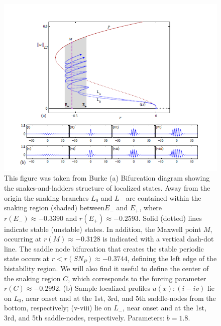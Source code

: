 \documentclass[pre,preprint,superscriptaddress]{revtex4-1}
\begin{document}
\begin{figure}[!htb]\center
\includegraphics[width=120mm]{BurkeSHE.PNG}
\caption{\label{fig:BurkeSHE}This figure was taken from Burke\cite{} (a) Bifurcation diagram showing the snakes-and-ladders structure of localized states. Away from the origin the snaking branches $L_0$ and $L_-$ are contained within the snaking region (shaded) between$E_-$ and $E_+$, where $r(E_-)\approx -0.3390$ and $r(E_+)\approx -0.2593$.   Solid (dotted) lines indicate stable (unstable) states. In addition, the Maxwell point $M$, occurring at $r(M)\approx -0.3128$  is indicated with a vertical dash-dot line.  The saddle node bifurcation that creates the stable periodic state occurs at $r<r(SN_P)\approx -0.3744$, defining the left edge of the bistability region.  We will also find it useful to define the center of the snaking region $C$, which corresponds to  the forcing parameter $r(C)\approx -0.2992$. (b) Sample localized profiles $u(x): (i-iv)$ lie on $L_0$, near onset and at the 1st, 3rd, and 5th saddle-nodes from the bottom, respectively; (v-viii) lie on $L_-$, near onset and at the 1st, 3rd, and 5th saddle-nodes, respectively. Parameters: $b = 1.8$.} 
\end{figure}
\end{document}
